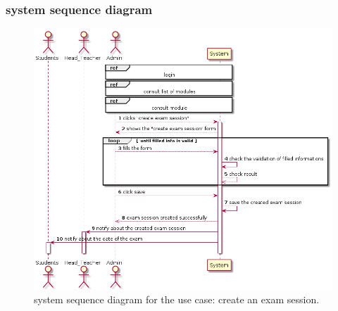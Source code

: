 \documentclass[]{uc2pfecaneva}
\begin{document}
    \subsubsection{system sequence diagram}
    \begin{figure}[h]

        \centering
        \includegraphics[width=\textwidth]{images/create_exam_session}

        \caption{system sequence diagram for the use case: create an exam session.}
    \end{figure}
    \clearpage
\end{document}
